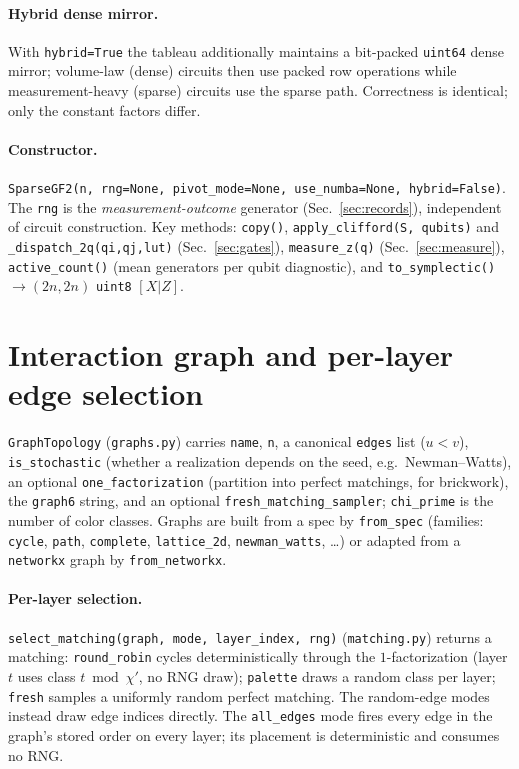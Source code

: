 \documentclass[11pt]{article}
\newcommand{\code}[1]{\texttt{#1}}
\newcommand{\file}[1]{\texttt{#1}}
\begin{document}
\paragraph{Hybrid dense mirror.} With \code{hybrid=True} the tableau additionally maintains a bit-packed
\code{uint64} dense mirror; volume-law (dense) circuits then use packed row operations while measurement-heavy
(sparse) circuits use the sparse path. Correctness is identical; only the constant factors differ.

\paragraph{Constructor.} \code{SparseGF2(n, rng=None, pivot\_mode=None, use\_numba=None, hybrid=False)}. The
\code{rng} is the \emph{measurement-outcome} generator (Sec.~\ref{sec:records}), independent of circuit
construction. Key methods: \code{copy()}, \code{apply\_clifford(S, qubits)} and \code{\_dispatch\_2q(qi,qj,lut)}
(Sec.~\ref{sec:gates}), \code{measure\_z(q)} (Sec.~\ref{sec:measure}), \code{active\_count()} (mean generators
per qubit diagnostic), and \code{to\_symplectic()} $\to (2n,2n)$ \code{uint8} $[X|Z]$.

\section{Interaction graph and per-layer edge selection}
\label{sec:graph}
\code{GraphTopology} (\file{graphs.py}) carries \code{name}, \code{n}, a canonical \code{edges} list ($u<v$),
\code{is\_stochastic} (whether a realization depends on the seed, e.g.\ Newman--Watts), an optional
\code{one\_factorization} (partition into perfect matchings, for brickwork), the \code{graph6} string, and an
optional \code{fresh\_matching\_sampler}; \code{chi\_prime} is the number of color classes. Graphs are built
from a spec by \code{from\_spec} (families: \code{cycle}, \code{path}, \code{complete}, \code{lattice\_2d},
\code{newman\_watts}, \dots) or adapted from a \code{networkx} graph by \code{from\_networkx}.

\paragraph{Per-layer selection.} \code{select\_matching(graph, mode, layer\_index, rng)}
(\file{matching.py}) returns a matching: \code{round\_robin} cycles deterministically through the
$1$-factorization (layer $t$ uses class $t\bmod\chi'$, no RNG draw); \code{palette} draws a random class per
layer; \code{fresh} samples a uniformly random perfect matching. The random-edge modes instead draw edge
indices directly. The \code{all\_edges} mode fires every edge in the graph's stored order on every layer; its
placement is deterministic and consumes no RNG.
\end{document}
